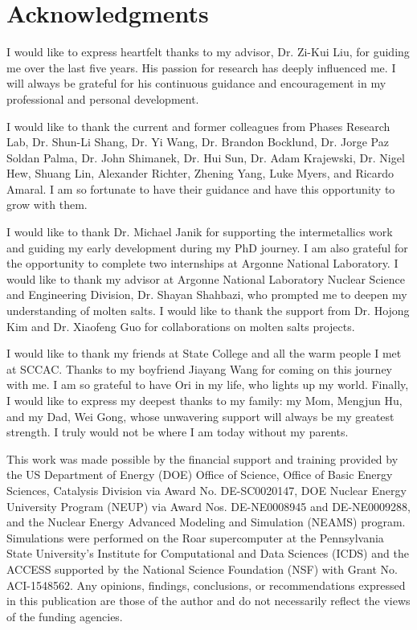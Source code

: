 \documentclass[letterpaper, 12pt]{report}
\begin{document}
\newpage
\renewcommand{\listfigurename}{List of Figures}
\addcontentsline{toc}{chapter}{\listfigurename}
\listoffigures


\newpage
\renewcommand{\listtablename}{List of Tables}
\addcontentsline{toc}{chapter}{\listtablename}
\listoftables

\newpage
\chapter*{Acknowledgments}
\label{acknowledgments}

I would like to express heartfelt thanks to my advisor, Dr. Zi-Kui Liu, for guiding me over the last five years. His passion for research has deeply influenced me. I will always be grateful for his continuous guidance and encouragement in my professional and personal development.

I would like to thank the current and former colleagues from Phases Research Lab, Dr. Shun-Li Shang, Dr. Yi Wang, Dr. Brandon Bocklund, Dr. Jorge Paz Soldan Palma, Dr. John Shimanek, Dr. Hui Sun, Dr. Adam Krajewski, Dr. Nigel Hew, Shuang Lin, Alexander Richter, Zhening Yang, Luke Myers, and Ricardo Amaral. I am so fortunate to have their guidance and have this opportunity to grow with them.

I would like to thank Dr. Michael Janik for supporting the intermetallics work and guiding my early development during my PhD journey. I am also grateful for the opportunity to complete two internships at Argonne National Laboratory. I would like to thank my advisor at Argonne National Laboratory Nuclear Science and Engineering Division, Dr. Shayan Shahbazi, who prompted me to deepen my understanding of molten salts. I would like to thank the support from Dr. Hojong Kim and Dr. Xiaofeng Guo for collaborations on molten salts projects.

I would like to thank my friends at State College and all the warm people I met at SCCAC. Thanks to my boyfriend Jiayang Wang for coming on this journey with me. I am so grateful to have Ori in my life, who lights up my world. Finally, I would like to express my deepest thanks to my family: my Mom, Mengjun Hu, and my Dad, Wei Gong, whose unwavering support will always be my greatest strength. I truly would not be where I am today without my parents.

This work was made possible by the financial support and training provided by the US Department of Energy (DOE) Office of Science, Office of Basic Energy Sciences, Catalysis Division via Award No. DE-SC0020147, DOE Nuclear Energy University Program (NEUP) via Award Nos. DE-NE0008945 and DE-NE0009288, and the Nuclear Energy Advanced Modeling and Simulation (NEAMS) program. Simulations were performed on the Roar supercomputer at the Pennsylvania State University's Institute for Computational and Data Sciences (ICDS) and the ACCESS supported by the National Science Foundation (NSF) with Grant No. ACI-1548562. Any opinions, findings, conclusions, or recommendations expressed in this publication are those of the author and do not necessarily reflect the views of the funding agencies.
\end{document}
